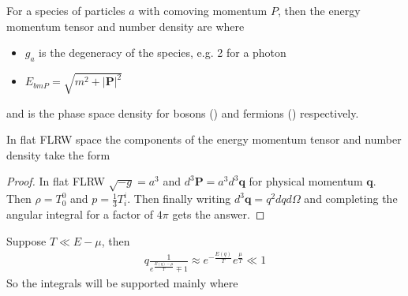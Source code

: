 \documentclass{article}
\begin{document}
\begin{definition}
For a species of particles $a$ with comoving momentum $P$, then the energy momentum tensor and number density are 
where 
\begin{itemize}
    \item $g_a$ is the degeneracy of the species, e.g. 2 for a photon
    \item $E_{bm{P}} = \sqrt{m^2 + |\bm{P}|^2}$
\end{itemize}
and 
is the phase space density for bosons () and fermions () respectively. 
\end{definition}

\begin{prop}
In flat FLRW space the components of the energy momentum tensor and number density take the form 
\end{prop}
\begin{proof}
In flat FLRW $\sqrt{-g} = a^3$ and $d^3\bm{P} = a^3 d^3\bm{q}$ for physical momentum $\bm{q}$. Then $\rho = T^0_0$ and $p=\frac{1}{3}T^i_i$. Then finally writing $d^3\bm{q}=q^2 dq d\Omega$ and completing the angular integral for a factor of $4\pi$ gets the answer. 
\end{proof}
Suppose $T \ll E - \mu $, then 
\begin{align}\label{eq:CSM:4}
q \frac{1}{e^\frac{E(q)-\mu}{T}\mp1} \approx  e^{-\frac{E(q)}{T}}e^{\frac{\mu}{T}} \ll 1 
\end{align}
So the integrals will be supported mainly where 
\end{document}
